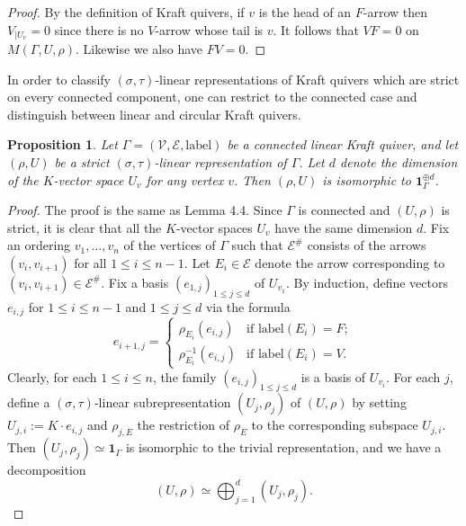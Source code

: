 \documentclass[12pt]{amsart}
\newtheorem{proposition}[theorem]{Proposition}
\theoremstyle{definition}
\newcommand{\<}{\langle}   %
\renewcommand{\>}{\rangle} %
\begin{document}
\begin{proof}
    By the definition of Kraft quivers, if $v$ is the head of an $F$-arrow then $V_{|U_v} = 0$ since there is no $V$-arrow whose tail is $v$. It follows that $VF = 0$ on $M(\Gamma,U,\rho)$. Likewise we also have $FV = 0$.
\end{proof}

In order to classify $(\sigma,\tau)$-linear representations of Kraft quivers which are strict on every connected component, one can restrict to the connected case and distinguish between linear and circular Kraft quivers. 

\begin{proposition}\label{ModuleAttachedToLinearKraftQuiver}
    Let $\Gamma = (\mathcal V,\mathcal E,\mathrm{label})$ be a connected linear Kraft quiver, and let $(\rho,U)$ be a strict $(\sigma,\tau)$-linear representation of $\Gamma$. Let $d$ denote the dimension of the $K$-vector space $U_v$ for any vertex $v$. Then $(\rho,U)$ is isomorphic to $\mathbf 1_{\Gamma}^{\oplus d}$.
\end{proposition}

\begin{proof}
    The proof is the same as \cite{chai:kraft2025} Lemma 4.4. Since $\Gamma$ is connected and $(U,\rho)$ is strict, it is clear that all the $K$-vector spaces $U_v$ have the same dimension $d$. Fix an ordering $v_1, \ldots , v_n$ of the vertices of $\Gamma$ such that $\mathcal E^{\#}$ consists of the arrows $(v_i,v_{i+1})$ for all $1 \leq i \leq n-1$. Let $E_i \in \mathcal E$ denote the arrow corresponding to $(v_i,v_{i+1}) \in \mathcal E^{\#}$. Fix a basis $(e_{1,j})_{1 \leq j \leq d}$ of $U_{v_1}$. By induction, define vectors $e_{i,j}$ for $1\leq i \leq n-1$ and $1 \leq j \leq d$ via the formula 
    \begin{equation*}
        e_{i+1,j} = \begin{cases}
            \rho_{E_{i}}(e_{i,j}) & \text{if } \mathrm{label}(E_{i}) = F;\\
            \rho_{E_i}^{-1}(e_{i,j}) & \text{if } \mathrm{label}(E_i) = V.
        \end{cases}
    \end{equation*}
    Clearly, for each $1\leq i \leq n$, the family $(e_{i,j})_{1\leq j\leq d}$ is a basis of $U_{v_i}$. For each $j$, define a $(\sigma,\tau)$-linear subrepresentation $(U_j,\rho_j)$ of $(U,\rho)$ by setting $U_{j,i} := K\cdot e_{i,j}$ and $\rho_{j,E}$ the restriction of $\rho_{E}$ to the corresponding subspace $U_{j,i}$. Then $(U_j,\rho_j) \simeq \mathbf 1_{\Gamma}$ is isomorphic to the trivial representation, and we have a decomposition
    \begin{equation*}
        (U,\rho) \simeq \bigoplus_{j=1}^{d} (U_j,\rho_j).
    \end{equation*}
\end{proof}
\end{document}
